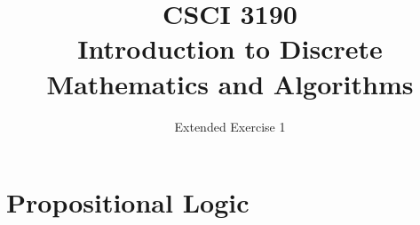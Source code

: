\documentclass{sig-alternate-05-2015}
\begin{document}






%

\title{CSCI 3190 \\ Introduction to Discrete Mathematics and Algorithms}
\subtitle{Extended Exercise 1}

\maketitle
\begin{abstract}

\end{abstract}

\keywords{}

\section{Propositional Logic}
\end{document}
